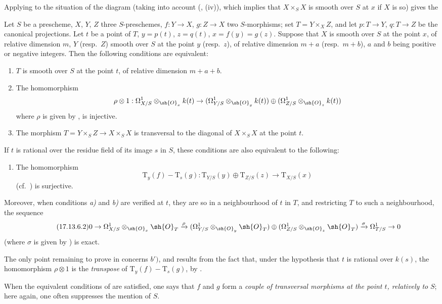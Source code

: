 \begin{env}[17.13.5]
Applying  to the situation of the diagram  (taking into account (, (iv)), which implies that $X\times_S X$ is smooth over $S$ at $x$ if $X$ is so) gives the
\end{env}

\begin{corollary}[17.13.6]
\label{IV.17.13.6}
Let $S$ be a prescheme, $X$, $Y$, $Z$ three $S$-preschemes, $f:Y\to X$, $g:Z\to X$ two $S$-morphisms; set $T=Y\times_X Z$, and let $p:T\to Y$, $q:T\to Z$ be the canonical projections.
Let $t$ be a point of $T$, $y=p(t)$, $z=q(t)$, $x=f(y)=g(z)$.
Suppose that $X$ is smooth over $S$ at the point $x$, of relative dimension $m$, $Y$ (resp.\ $Z$) smooth over $S$ at the point $y$ (resp.\ $z$), of relative dimension $m+a$ (resp.\ $m+b$), $a$ and $b$ being positive or negative integers.
Then the following conditions are equivalent:
\begin{enumerate}[label=\alph*)]
  \item $T$ is smooth over $S$ at the point $t$, of relative dimension $m+a+b$.
  \item The homomorphism
  \[
    \rho\otimes 1: \Omega^1_{X/S}\otimes_{\sh{O}_x}k(t) \to (\Omega^1_{Y/S}\otimes_{\sh{O}_y}k(t))\oplus(\Omega^1_{Z/S}\otimes_{\sh{O}_z}k(t))
  \]
  where $\rho$ is given by , is injective.
  \item The morphism $T=Y\times_S Z\to X\times_S X$ is transversal to the diagonal of $X\times_S X$ at the point $t$.
\end{enumerate}
If $t$ is rational over the residue field of its image $s$ in $S$, these conditions are also equivalent to the following:
\begin{enumerate}
  \item[b${}'$)] The homomorphism
  \[
  \label{IV.17.13.6.1}
  \tag{17.13.6.1}
    \mathrm{T}_y(f)-\mathrm{T}_s(g): \mathrm{T}_{Y/S}(y)\oplus\mathrm{T}_{Z/S}(z) \to \mathrm{T}_{X/S}(x)
  \]
  (cf.\ ) is surjective.
\end{enumerate}
Moreover, when conditions \emph{a)} and \emph{b)} are verified at $t$, they are so in a neighbourhood of $t$ in $T$, and restricting $T$ to such a neighbourhood, the sequence
\[
\label{IV.17.13.6.2}
\tag{17.13.6.2}
  0 \to \Omega^1_{X/S}\otimes_{\sh{O}_x}\sh{O}_T \xrightarrow{\rho} (\Omega^1_{Y/S}\otimes_{\sh{O}_y}\sh{O}_T)\oplus(\Omega^1_{Z/S}\otimes_{\sh{O}_z}\sh{O}_T) \xrightarrow{\sigma} \Omega^1_{T/S} \to 0
\]
(where $\sigma$ is given by ) is exact.

The only point remaining to prove in  concerns $b')$, and results from the fact that, under the hypothesis that $t$ is rational over $k(s)$, the homomorphism $\rho\otimes 1$ is the \emph{transpose} of $\mathrm{T}_y(f)-\mathrm{T}_s(g)$, by .

When the equivalent conditions of  are satisfied, one says that $f$ and $g$ form a \emph{couple of transversal morphisms at the point $t$, relatively to} $S$; here again, one often suppresses the mention of $S$.
\end{corollary}

